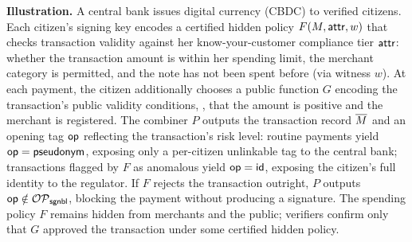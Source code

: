 \medskip
\noindent\textbf{Illustration.}
A central bank issues digital currency (CBDC) to verified citizens.
Each citizen's signing key encodes a certified hidden policy
$F(M, \mathsf{attr}, w)$ that checks transaction validity against her know-your-customer compliance tier $\mathsf{attr}$:
whether the transaction amount is within her spending limit,
the merchant category is permitted,
and the note has not been spent before (via witness $w$).
At each payment, the citizen additionally chooses a public function $G$
encoding the transaction's public validity conditions,
\eg, that the amount is positive and the merchant is registered.
The combiner $P$ outputs the transaction record $\overline{M}$
and an opening tag $\mathsf{op}$ reflecting the transaction's risk level:
routine payments yield $\mathsf{op} = \mathsf{pseudonym}$,
exposing only a per-citizen unlinkable tag to the central bank;
transactions flagged by $F$ as anomalous yield $\mathsf{op} = \mathsf{id}$,
exposing the citizen's full identity to the regulator.
If $F$ rejects the transaction outright, $P$ outputs $\mathsf{op} \notin \mathcal{OP}_\mathsf{sgnbl}$,
blocking the payment without producing a signature.
The spending policy $F$ remains hidden from merchants and the public;
verifiers confirm only that $G$ approved the transaction
under some certified hidden policy.
